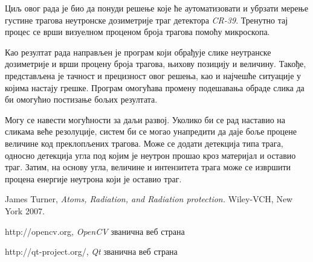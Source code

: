\documentclass[12pt,a4paper,serbian,oneside]{book}
\begin{document}
Циљ овог рада је био да понуди решење које ће аутоматизовати и убрзати мерење густине трагова неутронске дозиметрије траг детектора \textit{CR-39}. Тренутно тај процес се врши визуелном проценом броја трагова помоћу микроскопа.

Као резултат рада направљен је програм који обрађује слике неутранске дозиметрије и врши процену броја трагова, њихову позицију и величину. Такође, представљена је тачност и прецизност овог решења, као и најчешће ситуације у којима настају грешке. Програм омогућава промену подешавања обраде слика да би омогућио постизање бољих резултата.

Могу се навести могућности за даљи развој. Уколико би се рад наставио на сликама веће резолуције, систем би се могао унапредити да даје боље процене величине код преклопљених трагова. Може се додати детекција типа трага, односно детекција угла под којим је неутрон прошао кроз материјал и оставио траг. Затим, на основу угла, величине и интензитета трага може се извршити процена енергије неутрона који је оставио траг.  

%
%
%

\begin{thebibliography}{11}
 {James Turner, \textit{Atoms, Radiation, and Radiation protection.} Wiley-VCH, New York 2007.}

 http:\slash \slash opencv.org, \textit{OpenCV} званична веб страна

 http:\slash \slash qt-project.org/, \textit{Qt} званична веб страна

\end{thebibliography}

	
\end{document}
